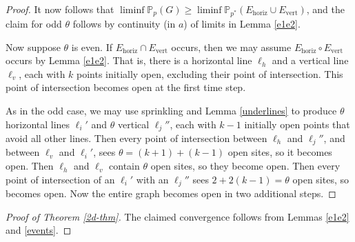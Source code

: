 \documentclass{amsart}
\newcommand{\prob}{\mathbb{P}}
\newcommand{\threshold}{\theta}
\newcommand{\vertical}{\text{vert}}
\newcommand{\horizontal}{\text{horiz}}
\numberwithin{equation}{section}
\newtheorem{theorem}{Theorem}[section]
\theoremstyle{definition}
\theoremstyle{remark}
\begin{document}
\begin{proof}
It now follows that $\liminf \prob_p(G)\ge \liminf\prob_{p^*}(E_{\horizontal} \cup E_{\vertical})$, 
and the claim for odd $\threshold$ follows by continuity (in $a$) of limits in Lemma \ref{e1e2}.

Now suppose  $\threshold$ is even. If $E_{\horizontal} \cap E_{\vertical}$ occurs, then 
we may assume $E_{\horizontal} \circ E_{\vertical}$ occurs by Lemma \ref{e1e2}.
That is, there is a horizontal line $\ell_h$ and a vertical line $\ell_v$, 
each with $k$ points initially open, excluding their point of intersection.
This point of intersection becomes open at the first time step. 

As in the odd case, we may use sprinkling and Lemma \ref{underlines} to produce
$\threshold$ horizontal lines $\ell_i'$ and $\threshold$ vertical 
$\ell_j''$, each with $k-1$ initially
open points that avoid all other lines.
Then every point of intersection between $\ell_h$ and $\ell_j''$, and between $\ell_v$ and 
$\ell_i'$, sees $\threshold = (k+1)+(k-1)$ open sites, so it becomes open.
Then $\ell_h$ and $\ell_v$ contain $\threshold$ open sites, so they become open.
Then every point of intersection of an $\ell_i'$ with an $\ell_j''$ sees 
$2 + 2(k-1) = \threshold$ open sites, so becomes open. Now
the entire graph becomes open in two additional steps.
\end{proof}

\begin{comment}
\begin{theorem}
Let $\threshold \ge 3$, $p=an^{-1-\frac{1}{k}}$ where $k = \lceil\frac{\threshold}{2}\rceil$. As $n \to \infty$, 
\begin{equation*}
\lim_{n \to \infty}\prob (F)= 
\begin{cases} (1-e^{-a^k/k!})^2 & \text{if $\threshold$ is even,}
\\
1-(e^{-a^k/k!})^2 &\text{if $\threshold$ is odd.}
\end{cases}
\end{equation*}
\end{theorem}
\end{comment}

\begin{proof}[Proof of Theorem \ref{2d-thm}]
The claimed convergence follows from Lemmas \ref{e1e2} and \ref{events}.
\end{proof}
\end{document}
